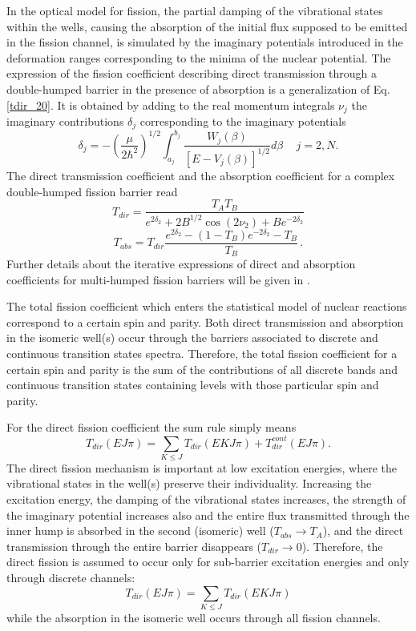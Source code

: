 In the optical model for fission, the partial damping of the vibrational
states within the wells, causing the absorption of the initial flux supposed
to be emitted in the fission channel, is simulated by the imaginary
potentials introduced in the deformation ranges corresponding to the minima
of the nuclear potential. The expression of the fission coefficient
describing direct transmission through a double-humped barrier in the
presence of absorption is a generalization of Eq.\ref{tdir_20}. It is
obtained by adding to the real momentum integrals $\nu_j$ the imaginary
contributions $\delta_j$ corresponding to the imaginary potentials \cite%
{Bhandari:79} 
\begin{equation}
\delta_j=-\left( \frac{\mu}{2\hbar^{2}}\right) ^{1/2}\int_{a_{j}}^{b_{j}}%
\frac{W_j(\beta)}{[E-V_{j}(\beta)]^{1/2}}d\beta\,\quad j=2,N.
\end{equation}
The direct transmission coefficient and the absorption coefficient for a
complex double-humped fission barrier read 
\begin{equation}
T_{dir}=\frac{T_{A}T_{B}}{e^{2\delta_2}+2B^{1/2}\cos
(2\nu_{2})+Be^{-2\delta_2}}  \label{tdir_2}
\end{equation}
\begin{equation}
T_{abs}=T_{dir}\frac{e^{2\delta_2}-(1-T_{B})e^{-2\delta_2}-T_{B}}{T_{B}}\,.
\label{tabs_2}
\end{equation}
Further details about the iterative expressions of direct and absorption
coefficients for multi-humped fission barriers will be given in \cite{Sin:07}%
.

The total fission coefficient which enters the statistical model of nuclear
reactions correspond to a certain spin and parity. Both direct transmission
and absorption in the isomeric well(s) occur through the barriers associated
to discrete and continuous transition states spectra. Therefore, the total
fission coefficient for a certain spin and parity is the sum of the
contributions of all discrete bands and continuous transition states
containing levels with those particular spin and parity.

For the direct fission coefficient the sum rule simply means 
\begin{equation}
T_{dir}(EJ\pi)= \sum_{K\le J}T_{dir}(EKJ\pi)+ T_{dir}^{cont}(EJ\pi).
\end{equation}
The direct fission mechanism is important at low excitation energies, where
the vibrational states in the well(s) preserve their individuality.
Increasing the excitation energy, the damping of the vibrational states
increases, the strength of the imaginary potential increases also and the
entire flux transmitted through the inner hump is absorbed in the second
(isomeric) well ($T_{abs}\rightarrow T_{A}$), and the direct transmission
through the entire barrier disappears ($T_{dir}\rightarrow0$). Therefore,
the direct fission is assumed to occur only for sub-barrier excitation
energies and only through discrete channels: 
\begin{equation}
T_{dir}(EJ\pi)=\sum_{K\le J}T_{dir}(EKJ\pi)  \label{tdirt}
\end{equation}
while the absorption in the isomeric well occurs through all fission
channels.

